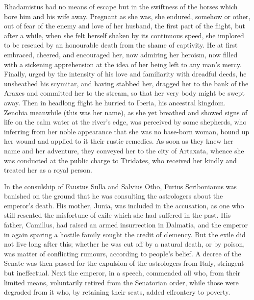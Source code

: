 Rhadamistus had no means of escape but in the swiftness of the horses which bore him and his wife away. Pregnant as she was, she endured, somehow or other, out of fear of the enemy and love of her husband, the first part of the flight, but after a while, when she felt herself shaken by its continuous speed, she implored to be rescued by an honourable death from the shame of captivity. He at first embraced, cheered, and encouraged her, now admiring her heroism, now filled with a sickening apprehension at the idea of her being left to any man's mercy. Finally, urged by the intensity of his love and familiarity with dreadful deeds, he unsheathed his scymitar, and having stabbed her, dragged her to the bank of the Araxes and committed her to the stream, so that her very body might be swept away. Then in headlong flight he hurried to Iberia, his ancestral kingdom. Zenobia meanwhile (this was her name), as she yet breathed and showed signs of life on the calm water at the river's edge, was perceived by some shepherds, who inferring from her noble appearance that she was no base-born woman, bound up her wound and applied to it their rustic remedies. As soon as they knew her name and her adventure, they conveyed her to the city of Artaxata, whence she was conducted at the public charge to Tiridates, who received her kindly and treated her as a royal person.


In the consulship of Faustus Sulla and Salvius Otho, Furius Scribonianus was banished on the ground that he was consulting the astrologers about the emperor's death. His mother, Junia, was included in the accusation, as one who still resented the misfortune of exile which she had suffered in the past. His father, Camillus, had raised an armed insurrection in Dalmatia, and the emperor in again sparing a hostile family sought the credit of clemency. But the exile did not live long after this; whether he was cut off by a natural death, or by poison, was matter of conflicting rumours, according to people's belief. A decree of the Senate was then passed for the expulsion of the astrologers from Italy, stringent but ineffectual. Next the emperor, in a speech, commended all who, from their limited means, voluntarily retired from the Senatorian order, while those were degraded from it who, by retaining their seats, added effrontery to poverty.


